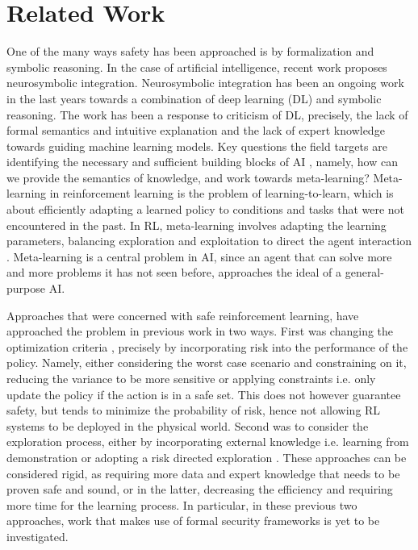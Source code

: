 \documentclass[a4paper,11pt]{article}
\begin{document}
\section{Related Work}
One of the many ways safety has been approached is by formalization and symbolic reasoning. 
In the case of artificial intelligence, recent work proposes neurosymbolic integration. 
Neurosymbolic integration has been an ongoing work in the last years towards a combination of deep learning (DL) and symbolic reasoning.
The work has been a response to criticism of DL, precisely, the lack of formal semantics and intuitive explanation and the lack of expert knowledge towards guiding machine learning models. 
Key questions the field targets are identifying the necessary and sufficient building blocks of AI \cite{garcez2020neurosymbolic}, namely, how can we provide the semantics of knowledge, 
and work towards meta-learning? Meta-learning in reinforcement learning is the problem of learning-to-learn, which is about efficiently
adapting a learned policy to conditions and tasks that were not encountered in the past. In RL, meta-learning
involves adapting the learning parameters, balancing exploration and exploitation to direct the
agent interaction \cite{gupta_meta-reinforcement_2018,schweighofer_meta-learning_2003}. Meta-learning is a central problem in AI, since an agent that can solve more
and more problems it has not seen before, approaches the ideal of a general-purpose AI. 

\medskip

Approaches that were concerned with safe reinforcement learning, have approached the problem in previous work \cite{Garca2015ACS} in two ways. First was changing the optimization criteria \cite{rockafellar2000}, precisely by incorporating risk into the performance of the policy.
Namely, either considering the worst case scenario and constraining on it, reducing the variance to be more sensitive or applying constraints i.e. only update the policy if the action is in a safe set. 
This does not however guarantee safety, but tends to minimize the probability of risk, hence not allowing RL systems to be deployed in the physical world. 
Second was to consider the exploration process, either by incorporating external knowledge i.e. learning from demonstration \cite{Siebel2007EvolutionaryRL} or adopting a risk directed exploration \cite{law2005}. These approaches can be considered rigid, 
as requiring more data and expert knowledge that needs to be proven safe and sound, or in the latter, decreasing the efficiency and requiring more time for the learning process. 
In particular, in these previous two approaches, work that makes use of formal security frameworks is yet to be investigated. 
\end{document}

